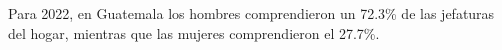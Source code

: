 Para 2022, en Guatemala los hombres comprendieron un 72.3\% de las jefaturas del hogar, mientras que las mujeres comprendieron el 27.7\%.